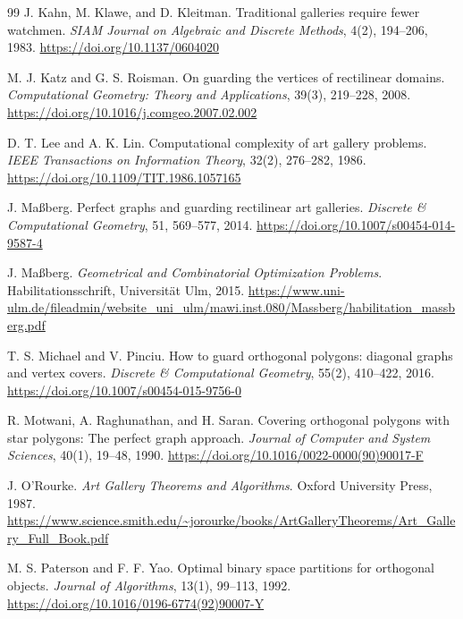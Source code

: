 \documentclass[11pt]{article}
\begin{document}
\begin{thebibliography}{99}
J. Kahn, M. Klawe, and D. Kleitman.
\newblock Traditional galleries require fewer watchmen.
\newblock \emph{SIAM Journal on Algebraic and Discrete Methods}, 4(2), 194--206, 1983.
\newblock \url{https://doi.org/10.1137/0604020}

M. J. Katz and G. S. Roisman.
\newblock On guarding the vertices of rectilinear domains.
\newblock \emph{Computational Geometry: Theory and Applications}, 39(3), 219--228, 2008.
\newblock \url{https://doi.org/10.1016/j.comgeo.2007.02.002}

D. T. Lee and A. K. Lin.
\newblock Computational complexity of art gallery problems.
\newblock \emph{IEEE Transactions on Information Theory}, 32(2), 276--282, 1986.
\newblock \url{https://doi.org/10.1109/TIT.1986.1057165}

J. Ma{\ss}berg.
\newblock Perfect graphs and guarding rectilinear art galleries.
\newblock \emph{Discrete \& Computational Geometry}, 51, 569--577, 2014.
\newblock \url{https://doi.org/10.1007/s00454-014-9587-4}

J. Ma{\ss}berg.
\newblock \emph{Geometrical and Combinatorial Optimization Problems}.
\newblock Habilitationsschrift, Universit\"at Ulm, 2015.
\newblock \url{https://www.uni-ulm.de/fileadmin/website_uni_ulm/mawi.inst.080/Massberg/habilitation_massberg.pdf}

T. S. Michael and V. Pinciu.
\newblock How to guard orthogonal polygons: diagonal graphs and vertex covers.
\newblock \emph{Discrete \& Computational Geometry}, 55(2), 410--422, 2016.
\newblock \url{https://doi.org/10.1007/s00454-015-9756-0}

R. Motwani, A. Raghunathan, and H. Saran.
\newblock Covering orthogonal polygons with star polygons: The perfect graph approach.
\newblock \emph{Journal of Computer and System Sciences}, 40(1), 19--48, 1990.
\newblock \url{https://doi.org/10.1016/0022-0000(90)90017-F}

J. O'Rourke.
\newblock \emph{Art Gallery Theorems and Algorithms}.
\newblock Oxford University Press, 1987.
\newblock \url{https://www.science.smith.edu/~jorourke/books/ArtGalleryTheorems/Art_Gallery_Full_Book.pdf}

M. S. Paterson and F. F. Yao.
\newblock Optimal binary space partitions for orthogonal objects.
\newblock \emph{Journal of Algorithms}, 13(1), 99--113, 1992.
\newblock \url{https://doi.org/10.1016/0196-6774(92)90007-Y}


\end{thebibliography}
\end{document}
